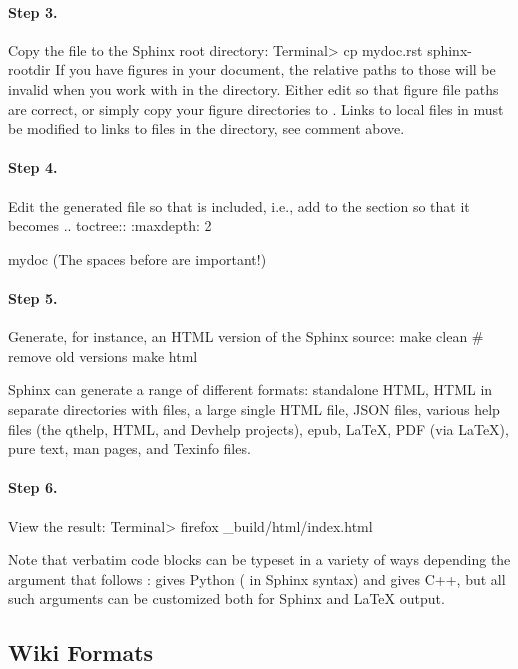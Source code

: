 \documentclass{book}
\begin{document}
\paragraph{Step 3.}
Copy the  file to the Sphinx root directory:
\bsys
Terminal> cp mydoc.rst sphinx-rootdir
\esys
If you have figures in your document, the relative paths to those will
be invalid when you work with  in the 
directory. Either edit  so that figure file paths are correct,
or simply copy your figure directories to .
Links to local files in  must be modified to links to
files in the  directory, see comment above.

\paragraph{Step 4.}
Edit the generated  file so that 
is included, i.e., add  to the  section so that it becomes
\bccq
.. toctree::
   :maxdepth: 2

   mydoc
\eccq
(The spaces before  are important!)

\paragraph{Step 5.}
Generate, for instance, an HTML version of the Sphinx source:
\bsys
make clean   # remove old versions
make html
\esys

Sphinx can generate a range of different formats:
standalone HTML, HTML in separate directories with  files,
a large single HTML file, JSON files, various help files (the qthelp, HTML,
and Devhelp projects), epub, {\LaTeX}, PDF (via {\LaTeX}), pure text, man pages,
and Texinfo files.

\paragraph{Step 6.}
View the result:
\bsys
Terminal> firefox _build/html/index.html
\esys

Note that verbatim code blocks can be typeset in a variety of ways
depending the argument that follows :  gives Python
( in Sphinx syntax) and  gives C++, but
all such arguments can be customized both for Sphinx and {\LaTeX} output.

\subsection{Wiki Formats}
\end{document}
